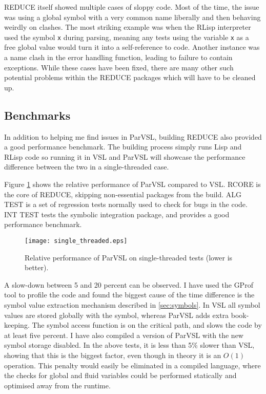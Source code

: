 REDUCE itself showed multiple cases of sloppy code. Most of the time, the issue was using
a global symbol with a very common name liberally and then behaving weirdly
on clashes. The most striking example was when the RLisp interpreter used the symbol \texttt{x}
during parsing, meaning any tests using the variable \texttt{x} as a free global value
would turn it into a self-reference to code.
Another instance was a name clash in the error handling function, leading to failure
to contain exceptions. While these cases have been fixed, there are many other
such potential problems within the REDUCE packages which will have to be cleaned up.

\subsection{Benchmarks}

In addition to helping me find issues in ParVSL, building REDUCE also provided a
good performance benchmark. The building process simply runs Lisp and RLisp code so
running it in VSL and ParVSL will showcase the performance difference between the
two in a single-threaded case.

Figure \ref{fig:single-threaded} shows the relative performance of ParVSL compared to VSL.
RCORE is the core of REDUCE, skipping non-essential packages from the build. ALG TEST is
a set of regression tests normally used to check for bugs in the code. INT TEST tests the
symbolic integration package, and provides a good performance benchmark.

\begin{figure}[H]
  \centering
  \texttt{[image: single\_threaded.eps]}
  \caption[VSL vs ParVSL single-threaded performance.]{Relative performance of ParVSL on single-threaded tests (lower is better).}
  \label{fig:single-threaded}
\end{figure}

A slow-down between 5 and 20 percent can be observed. I have used the GProf \cite{gprof}
tool to profile the code and found the biggest cause of the time difference is the
symbol value extraction mechanism described in \ref{sec:symbols}. In VSL all symbol
values are stored globally with the symbol, whereas ParVSL adds extra book-keeping.
The symbol access function is on the critical path, and slows the code by at least
five percent. I have also compiled a version of ParVSL with the new symbol
storage disabled. In the above tests, it is less than 5\% slower than VSL, showing
that this is the biggest factor, even though in theory it is an $O(1)$ operation.
This penalty would easily be eliminated in a compiled language, where the
checks for global and fluid variables could be performed statically and optimised away
from the runtime.

